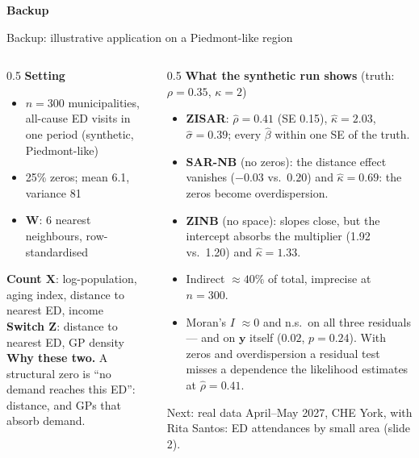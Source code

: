 \documentclass[10pt,aspectratio=169]{beamer}
\newcommand{\bW}{\mathbf{W}}
\newcommand{\bX}{\mathbf{X}}
\newcommand{\bZ}{\mathbf{Z}}
\newcommand{\by}{\mathbf{y}}
\newcommand{\sect}[1]{\begin{frame}[plain]\centering\vfill{\usebeamercolor[fg]{title}\LARGE\bfseries #1}\vfill\end{frame}}
\begin{document}
\appendix
\sect{Backup}

\begin{frame}{Backup: illustrative application on a Piedmont-like region}
  \footnotesize
  \begin{columns}[T]
    \begin{column}{0.5\textwidth}
      \textbf{Setting}
      \begin{itemize}
        \item $n=300$ municipalities, all-cause ED visits in one period (synthetic, Piedmont-like)
        \item 25\% zeros; mean 6.1, variance 81
        \item $\bW$: 6 nearest neighbours, row-standardised
      \end{itemize}
      \vspace{0.2em}
      \textbf{Count $\bX$}: log-population, aging index, distance to nearest ED, income\\[2pt]
      \textbf{Switch $\bZ$}: distance to nearest ED, GP density\\[4pt]
      {\color{navy}\textbf{Why these two.}} A structural zero is ``no demand reaches this ED'': distance, and GPs that absorb demand.
    \end{column}
    \begin{column}{0.5\textwidth}
      \textbf{What the synthetic run shows} {\scriptsize(truth: $\rho=0.35$, $\kappa=2$)}
      \begin{itemize}\setlength{\itemsep}{0.25em}
        \item \textbf{ZISAR}: $\hat\rho=0.41$ (SE 0.15), $\hat\kappa=2.03$, $\hat\sigma=0.39$; every $\hat\beta$ within one SE of the truth.
        \item \textbf{SAR-NB} (no zeros): the distance effect vanishes ($-0.03$ vs.\ $0.20$) and $\hat\kappa=0.69$: the zeros become overdispersion.
        \item \textbf{ZINB} (no space): slopes close, but the intercept absorbs the multiplier (1.92 vs.\ 1.20) and $\hat\kappa=1.33$.
        \item Indirect $\approx40\%$ of total, imprecise at $n=300$.
        \item Moran's $I$ $\approx0$ and n.s.\ on all three residuals --- and on $\by$ itself ($0.02$, $p=0.24$). With zeros and overdispersion a residual test misses a dependence the likelihood estimates at $\hat\rho=0.41$.
      \end{itemize}
      \vspace{0.1em}
      \begin{block}{Next: real data}
        April--May 2027, \alert{CHE York}, with Rita Santos: ED attendances by small area (slide 2).
      \end{block}
    \end{column}
  \end{columns}
\end{frame}
\end{document}
